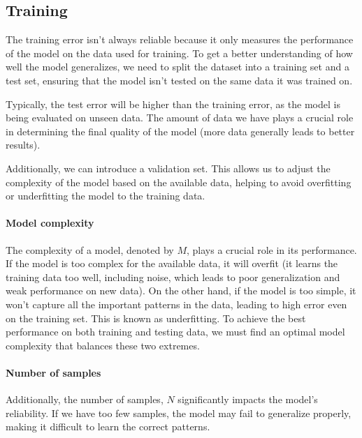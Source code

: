 \subsection{Training}
The training error isn't always reliable because it only measures the performance of the model on the data used for training. 
To get a better understanding of how well the model generalizes, we need to split the dataset into a training set and a test set, ensuring that the model isn't tested on the same data it was trained on.

Typically, the test error will be higher than the training error, as the model is being evaluated on unseen data. 
The amount of data we have plays a crucial role in determining the final quality of the model (more data generally leads to better results).

Additionally, we can introduce a validation set. 
This allows us to adjust the complexity of the model based on the available data, helping to avoid overfitting or underfitting the model to the training data.

\paragraph*{Model complexity}
The complexity of a model, denoted by $M$, plays a crucial role in its performance.
If the model is too complex for the available data, it will overfit (it learns the training data too well, including noise, which leads to poor generalization and weak performance on new data).
On the other hand, if the model is too simple, it won't capture all the important patterns in the data, leading to high error even on the training set. This is known as underfitting.
To achieve the best performance on both training and testing data, we must find an optimal model complexity that balances these two extremes.

\paragraph*{Number of samples}
Additionally, the number of samples, $N$ significantly impacts the model's reliability. 
If we have too few samples, the model may fail to generalize properly, making it difficult to learn the correct patterns.


